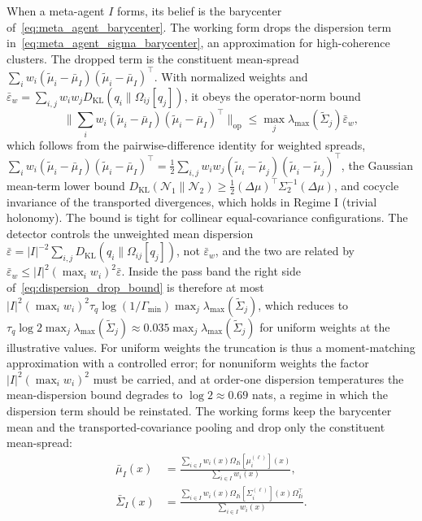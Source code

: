 \documentclass[11pt]{article}
\begin{document}
When a meta-agent $I$ forms, its belief is the barycenter of~\eqref{eq:meta_agent_barycenter}. The working form drops the dispersion term in~\eqref{eq:meta_agent_sigma_barycenter}, an approximation for high-coherence clusters. The dropped term is the constituent mean-spread $\sum_i w_i (\tilde{\mu}_i - \bar{\mu}_I)(\tilde{\mu}_i - \bar{\mu}_I)^\top$. With normalized weights and $\bar{\varepsilon}_w = \sum_{i,j} w_i w_j D_{\mathrm{KL}}(q_i \| \Omega_{ij}[q_j])$, it obeys the operator-norm bound
\begin{equation}
\Big\|\sum_i w_i (\tilde{\mu}_i - \bar{\mu}_I)(\tilde{\mu}_i - \bar{\mu}_I)^\top\Big\|_{\mathrm{op}} \le \max_j \lambda_{\max}(\tilde{\Sigma}_j) \bar{\varepsilon}_w,
\label{eq:dispersion_drop_bound}
\end{equation}
which follows from the pairwise-difference identity for weighted spreads, $\sum_i w_i (\tilde{\mu}_i - \bar{\mu}_I)(\tilde{\mu}_i - \bar{\mu}_I)^\top = \tfrac12\sum_{i,j} w_i w_j (\tilde{\mu}_i - \tilde{\mu}_j)(\tilde{\mu}_i - \tilde{\mu}_j)^\top$, the Gaussian mean-term lower bound $D_{\mathrm{KL}}(\mathcal{N}_1 \| \mathcal{N}_2) \ge \tfrac12(\Delta\mu)^\top\Sigma_2^{-1}(\Delta\mu)$, and cocycle invariance of the transported divergences, which holds in Regime I (trivial holonomy). The bound is tight for collinear equal-covariance configurations. The detector controls the unweighted mean dispersion $\bar{\varepsilon} = |I|^{-2}\sum_{i,j} D_{\mathrm{KL}}(q_i \| \Omega_{ij}[q_j])$, not $\bar{\varepsilon}_w$, and the two are related by $\bar{\varepsilon}_w \le |I|^2 (\max_i w_i)^2 \bar{\varepsilon}$. Inside the pass band the right side of~\eqref{eq:dispersion_drop_bound} is therefore at most $|I|^2(\max_i w_i)^2 \tau_q\log(1/\Gamma_{\min}) \max_j \lambda_{\max}(\tilde{\Sigma}_j)$, which reduces to $\tau_q \log 2 \max_j \lambda_{\max}(\tilde{\Sigma}_j) \approx 0.035 \max_j \lambda_{\max}(\tilde{\Sigma}_j)$ for uniform weights at the illustrative values. For uniform weights the truncation is thus a moment-matching approximation with a controlled error; for nonuniform weights the factor $|I|^2(\max_i w_i)^2$ must be carried, and at order-one dispersion temperatures the mean-dispersion bound degrades to $\log 2 \approx 0.69$ nats, a regime in which the dispersion term should be reinstated. The working forms keep the barycenter mean and the transported-covariance pooling and drop only the constituent mean-spread:
\begin{align}
\bar{\mu}_I(x) &= \frac{\sum_{i \in I} w_i(x) \Omega_{Ii}[\mu_i^{(\ell)}](x)}{\sum_{i \in I} w_i(x)},
\label{eq:meta_agent_mu_impl}
\\
\bar{\Sigma}_I(x) &= \frac{\sum_{i \in I} w_i(x) \Omega_{Ii}[\Sigma_i^{(\ell)}](x) \Omega_{Ii}^\top}{\sum_{i \in I} w_i(x)}.
\label{eq:meta_agent_sigma_impl}
\end{align}
\end{document}

